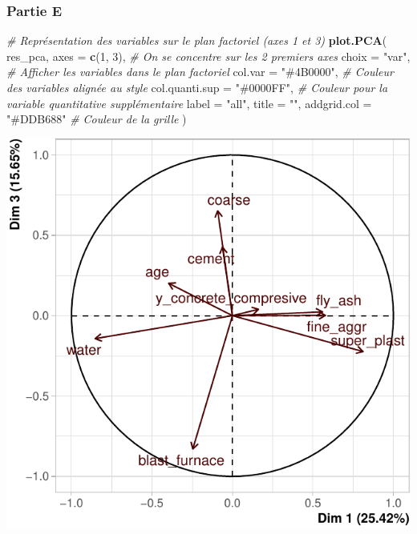 \documentclass[
  12pt,
]{article}
\newenvironment{Shaded}{\begin{snugshade}}{\end{snugshade}}
\newcommand{\AttributeTok}[1]{\textcolor[rgb]{0.13,0.29,0.53}{#1}}
\newcommand{\CommentTok}[1]{\textcolor[rgb]{0.56,0.35,0.01}{\textit{#1}}}
\newcommand{\DecValTok}[1]{\textcolor[rgb]{0.00,0.00,0.81}{#1}}
\newcommand{\FunctionTok}[1]{\textcolor[rgb]{0.13,0.29,0.53}{\textbf{#1}}}
\newcommand{\NormalTok}[1]{#1}
\newcommand{\StringTok}[1]{\textcolor[rgb]{0.31,0.60,0.02}{#1}}
\begin{document}
\subsubsection{Partie E}\label{partie-e}

\begin{Shaded}
\begin{Highlighting}[]
\CommentTok{\# Représentation des variables sur le plan factoriel (axes 1 et 3)}
\FunctionTok{plot.PCA}\NormalTok{(}
\NormalTok{  res\_pca,}
  \AttributeTok{axes =} \FunctionTok{c}\NormalTok{(}\DecValTok{1}\NormalTok{, }\DecValTok{3}\NormalTok{),             }\CommentTok{\# On se concentre sur les 2 premiers axes}
  \AttributeTok{choix =} \StringTok{"var"}\NormalTok{,              }\CommentTok{\# Afficher les variables dans le plan factoriel}
  \AttributeTok{col.var =} \StringTok{"\#4B0000"}\NormalTok{,        }\CommentTok{\# Couleur des variables alignée au style}
  \AttributeTok{col.quanti.sup =} \StringTok{"\#0000FF"}\NormalTok{, }\CommentTok{\# Couleur pour la variable quantitative supplémentaire}
  \AttributeTok{label =} \StringTok{"all"}\NormalTok{,}
  \AttributeTok{title =} \StringTok{""}\NormalTok{,}
  \AttributeTok{addgrid.col =} \StringTok{"\#DDB688"}     \CommentTok{\# Couleur de la grille}
\NormalTok{)}
\end{Highlighting}
\end{Shaded}

\begin{center}\includegraphics{rmd_final_files/figure-latex/unnamed-chunk-55-1} \end{center}
\end{document}
